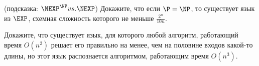\begin{ptask}{26}(подсказка: $\NEXP^{\NP} vs. \NEXP$)
    Докажите, что если $\P = \NP$, то существует язык из $\EXP$, схемная сложность которого не меньше $\frac{2^n}{10 n}$.
\end{ptask}

\begin{ptask}{27}
	Докажите, что существует язык, для которого любой алгоритм, работающий время $O(n^2)$ решает его правильно на менее, чем на
    половине входов какой-то длины, но этот язык распознается алгоритмом, работающим время $O(n^3)$.
\end{ptask}